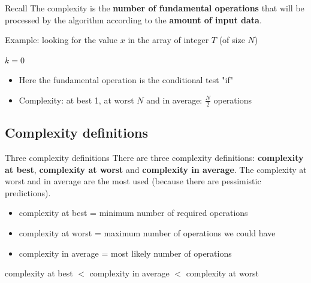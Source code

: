 \documentclass{beamer}[10pt, usepdftitle=false, handout]
\begin{document}
	\begin{frame}
	
	\begin{exampleblock}{Recall}
	The complexity is the \textbf{number of fundamental operations} that will be processed by the algorithm according to the \textbf{amount of input data}.
	\end{exampleblock}
	
	Example: looking for the value $x$ in the array of integer $T$ (of size $N$)
	
	\begin{center}    
    \scalebox{0.75} {
    \begin{algorithm}[H]
	$k=0$\; 	
 	\caption{pseudo-code of basic search algorithm}
	\end{algorithm}	
	}
	\end{center} 
	
	\begin{itemize}
	\item{Here the fundamental operation is the conditional test "if"}
	\item{Complexity: at best 1, at worst $N$ and in average: $\frac{N}{2}$ operations}
	\end{itemize}	
			
	\end{frame}
	
	\subsection{Complexity definitions}
	
	\begin{frame}		
	
	\begin{exampleblock}{Three complexity definitions}
	There are three complexity definitions: \textbf{complexity at best},  \textbf{complexity at worst} and \textbf{complexity in average}. The complexity at worst and in average are the most used (because there are pessimistic predictions).	
	\end{exampleblock}	
	
	\begin{itemize}
	\item {complexity at best = minimum number of required operations}
	\item {complexity at worst = maximum number of operations we could have}
	\item {complexity in average = most likely number of operations}	
	\end{itemize}	
	
	\vspace*{1em}	
	
	complexity at best $<$ complexity in average $<$ complexity at worst
	
	\end{frame}
	
\end{document}
